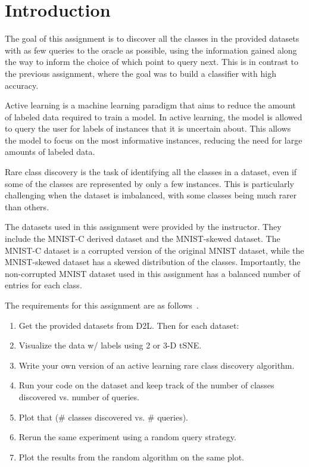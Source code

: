 \section{Introduction}
The goal of this assignment is to discover all the classes in the provided datasets with as few queries to the oracle as possible, using the information gained along the way to inform the choice of which point to query next. This is in contrast to the previous assignment, where the goal was to build a classifier with high accuracy.

Active learning is a machine learning paradigm that aims to reduce the amount of labeled data required to train a model. In active learning, the model is allowed to query the user for labels of instances that it is uncertain about. This allows the model to focus on the most informative instances, reducing the need for large amounts of labeled data.

Rare class discovery is the task of identifying all the classes in a dataset, even if some of the classes are represented by only a few instances. This is particularly challenging when the dataset is imbalanced, with some classes being much rarer than others.

The datasets used in this assignment were provided by the instructor. They include the MNIST-C derived dataset and the MNIST-skewed dataset. The MNIST-C dataset is a corrupted version of the original MNIST dataset, while the MNIST-skewed dataset has a skewed distribution of the classes. Importantly, the non-corrupted MNIST dataset used in this assignment has a balanced number of entries for each class.

The requirements for this assignment are as follows~\cite{assignment9}.
\begin{enumerate}    
    \item Get the provided datasets from D2L. Then for each dataset:
    \item Visualize the data w/ labels using 2 or 3-D tSNE.
    \item Write your own version of an active learning rare class discovery algorithm.
    \item Run your code on the dataset and keep track of the number of classes discovered vs. number of queries.
    \item Plot that (\# classes discovered vs. \# queries).
    \item Rerun the same experiment using a random query strategy.
    \item Plot the results from the random algorithm on the same plot.    
\end{enumerate}

